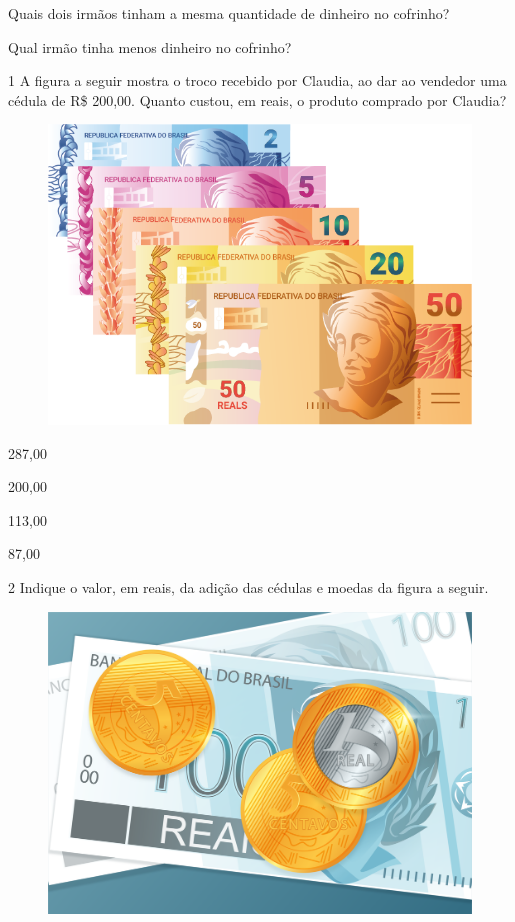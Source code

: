 \begin{escolha}
\item Quais dois irmãos tinham a mesma quantidade de dinheiro no cofrinho?

\item Qual irmão tinha menos dinheiro no cofrinho?
\end{escolha}


\num{1} A figura a seguir mostra o troco recebido por Claudia, ao dar ao vendedor
uma cédula de R\$ 200,00. Quanto custou, em reais, o produto comprado por Claudia?


\begin{figure}[htpb!]
\centering
\includegraphics[width=.5\textwidth]{./media/image78.png}
\end{figure}

\begin{escolha}
\item 287,00

\item 200,00

\item 113,00

\item 87,00
\end{escolha}

\pagebreak
\num{2} Indique o valor, em reais, da adição das cédulas e moedas da figura a seguir.


\begin{figure}[htpb!]
\centering
\includegraphics[width=.5\textwidth]{./media/image79.png}
\end{figure}

